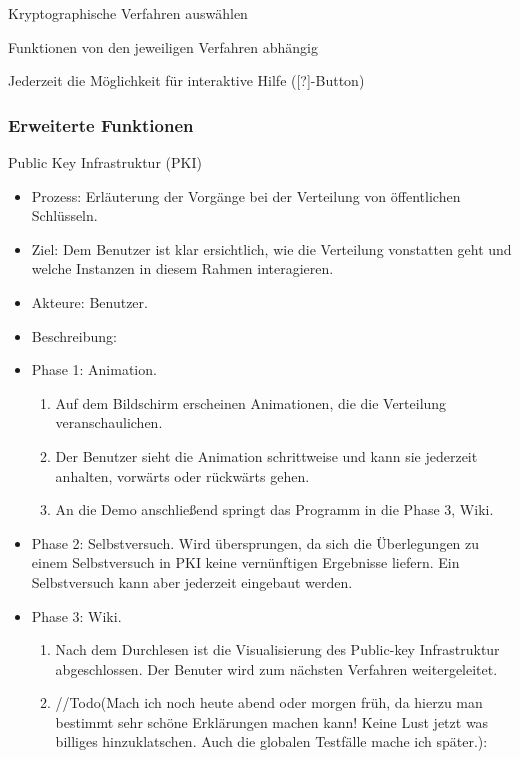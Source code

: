 \documentclass{article}
\begin{document}
\begin{FA}[start=200]
\item Kryptographische Verfahren auswählen
\end{FA}

\begin{FA}[start=300]
\item Funktionen von den jeweiligen Verfahren abhängig
\end{FA}

\begin{FA}[start=400]
\item Jederzeit die Möglichkeit für interaktive Hilfe ([?]-Button)
\end{FA}

\subsubsection{Erweiterte Funktionen}

\begin{FA}[start=500]
\item Public Key Infrastruktur (PKI)
\end{FA}
\begin{itemize}[label={}]
\item Prozess: Erläuterung der Vorgänge bei der Verteilung von öffentlichen Schlüsseln.
\item Ziel: Dem Benutzer ist klar ersichtlich, wie die Verteilung vonstatten geht und welche Instanzen in diesem Rahmen interagieren.
\item Akteure: Benutzer.
\item Beschreibung:
\item Phase 1: Animation.
\begin{enumerate}
\item Auf dem Bildschirm erscheinen Animationen, die die Verteilung veranschaulichen.
\item Der Benutzer sieht die Animation schrittweise und kann sie jederzeit anhalten, vorwärts oder rückwärts gehen.
\item An die Demo anschließend springt das Programm in die Phase 3, Wiki.
\end{enumerate}
\item Phase 2: Selbstversuch. Wird übersprungen, da sich die Überlegungen zu einem Selbstversuch in PKI keine vernünftigen Ergebnisse liefern. Ein Selbstversuch kann aber jederzeit eingebaut werden.
\item Phase 3: Wiki.
\begin{enumerate}
\item Nach dem Durchlesen ist die Visualisierung des Public-key Infrastruktur abgeschlossen. Der Benuter wird zum nächsten Verfahren weitergeleitet.
\item //Todo(Mach ich noch heute abend oder morgen früh, da hierzu man bestimmt sehr schöne Erklärungen machen kann! Keine Lust jetzt was billiges hinzuklatschen. Auch die globalen Testfälle mache ich später.):
\end{enumerate}
\end{itemize}
\end{document}
